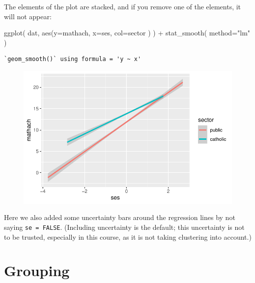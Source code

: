 \documentclass[
  letterpaper,
  DIV=11,
  numbers=noendperiod]{scrreprt}
\newenvironment{Shaded}{\begin{snugshade}}{\end{snugshade}}
\newcommand{\AttributeTok}[1]{\textcolor[rgb]{0.49,0.56,0.16}{#1}}
\newcommand{\FunctionTok}[1]{\textcolor[rgb]{0.02,0.16,0.49}{#1}}
\newcommand{\NormalTok}[1]{\textcolor[rgb]{0.00,0.44,0.13}{#1}}
\newcommand{\SpecialCharTok}[1]{\textcolor[rgb]{0.25,0.44,0.63}{#1}}
\newcommand{\StringTok}[1]{\textcolor[rgb]{0.25,0.44,0.63}{#1}}
\begin{document}
The elements of the plot are stacked, and if you remove one of the
elements, it will not appear:

\begin{Shaded}
\begin{Highlighting}[]
\FunctionTok{ggplot}\NormalTok{( dat, }\FunctionTok{aes}\NormalTok{(}\AttributeTok{y=}\NormalTok{mathach, }\AttributeTok{x=}\NormalTok{ses, }\AttributeTok{col=}\NormalTok{sector ) ) }\SpecialCharTok{+} 
  \FunctionTok{stat\_smooth}\NormalTok{( }\AttributeTok{method=}\StringTok{"lm"}\NormalTok{ )}
\end{Highlighting}
\end{Shaded}

\begin{verbatim}
`geom_smooth()` using formula = 'y ~ x'
\end{verbatim}

\begin{figure}[H]

{\centering \includegraphics{intro_ggplot_files/figure-pdf/unnamed-chunk-5-1.pdf}

}

\end{figure}

Here we also added some uncertainty bars around the regression lines by
not saying \texttt{se\ =\ FALSE}. (Including uncertainty is the default;
this uncertainty is not to be trusted, especially in this course, as it
is not taking clustering into account.)

\hypertarget{grouping}{%
\section{Grouping}\label{grouping}}
\end{document}
